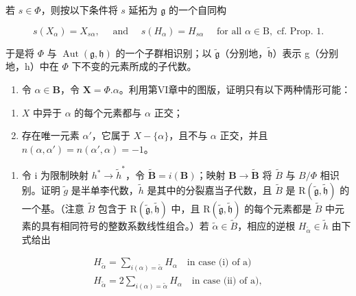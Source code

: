 若 \(s \in \varPhi\)，则按以下条件将 \(s\) 延拓为 \(\mathfrak{g}\) 的一个自同构

\[
s (X _ {\alpha}) = X _ {s \alpha}, \quad \text { and } \quad s (H _ {\alpha}) = H _ {s \alpha} \quad \text { for   all } \alpha \in \mathrm{B}, \text { cf.   Prop. } 1.
\]

于是将 \(\varPhi\) 与 \(\operatorname{Aut}(\mathfrak{g},\mathfrak{h})\) 的一个子群相识别；以 \(\tilde{\mathfrak{g}}\)（分别地，\(\tilde{\mathfrak{h}}\)）表示 g（分别地，h）中在 \(\varPhi\) 下不变的元素所成的子代数。

\begin{enumerate}
\def\labelenumi{\alph{enumi})}
\tightlist
\item
  令 \(\alpha \in \mathbf{B}\)，令 \(\mathbf{X} = \varPhi.\alpha\)。利用第VI章中的图版，证明只有以下两种情形可能：
\end{enumerate}

\begin{enumerate}
\def\labelenumi{(\roman{enumi})}
\item
  \(X\) 中异于 \(\alpha\) 的每个元素都与 \(\alpha\) 正交；
\item
  存在唯一元素 \(\alpha'\)，它属于 \(X - \{\alpha\}\)，且不与 \(\alpha\) 正交，并且 \(n(\alpha, \alpha') = n(\alpha', \alpha) = -1\)。
\end{enumerate}

\begin{enumerate}
\def\labelenumi{\alph{enumi})}
\setcounter{enumi}{1}
\tightlist
\item
  令 i 为限制映射 \(h^{*} \to \tilde{h}^{*}\)，令 \(\tilde{\mathbf{B}} = i(\mathbf{B})\)；映射 \(\mathbf{B} \to \tilde{\mathbf{B}}\) 将 \(\tilde{B}\) 与 \(B/\varPhi\) 相识别。证明 \(\tilde{g}\) 是半单李代数，\(\tilde{h}\) 是其中的分裂嘉当子代数，且 \(\tilde{B}\) 是 \(\mathrm{R}(\tilde{\mathfrak{g}}, \tilde{\mathfrak{h}})\) 的一个基。（注意 \(\tilde{B}\) 包含于 \(\mathrm{R}(\tilde{\mathfrak{g}}, \tilde{\mathfrak{h}})\) 中，且 \(\mathrm{R}(\tilde{\mathfrak{g}}, \tilde{\mathfrak{h}})\) 的每个元素都是 \(\tilde{B}\) 中元素的具有相同符号的整数系数线性组合。）若 \(\tilde{\alpha} \in \tilde{B}\)，相应的逆根 \(H_{\tilde{\alpha}} \in \tilde{h}\) 由下式给出
\end{enumerate}

\[
\begin{array}{l} H _ {\tilde {\alpha}} = \sum_ {i (\alpha) = \tilde {\alpha}} H _ {\alpha} \quad \text {in case (i) of a)} \\ H _ {\tilde {\alpha}} = 2 \sum_ {i (\alpha) = \tilde {\alpha}} H _ {\alpha} \quad \text {in case (ii) of a)}, \end{array}
\]

